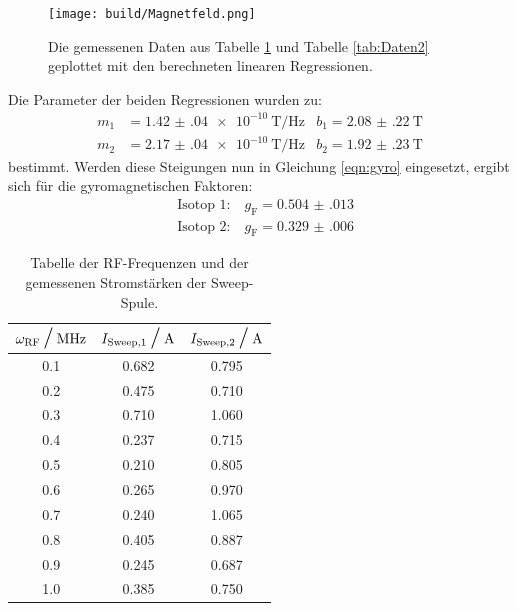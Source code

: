 		\begin{figure}[H]
			\centering
			\texttt{[image: build/Magnetfeld.png]}
			\caption{Die gemessenen Daten aus Tabelle \ref{tab:Daten1} und Tabelle \ref{tab:Daten2} geplottet mit den berechneten linearen Regressionen.}
			\label{fig:Daten} 
		\end{figure}

		\noindent
		Die Parameter der beiden Regressionen wurden zu:
		\begin{align*}
			m_1 &= \SI{1.42(04)e-10}{\tesla\per\hertz}  &b_1= \SI{2.08(22)}{\tesla}\\
			m_2 &= \SI{2.17(04)e-10}{\tesla\per\hertz}  &b_2= \SI{1.92(23)}{\tesla}
		\end{align*}
		bestimmt. Werden diese Steigungen nun in Gleichung \ref{eqn:gyro} eingesetzt, ergibt sich für die gyromagnetischen Faktoren:
		\begin{align*}
			&\text{Isotop 1:} \quad g_\text{F} = \num{0.504(013)}\\		
			&\text{Isotop 2:} \quad g_\text{F} = \num{0.329(006)}			
		\end{align*}

		\begin{table}[h]
			\begin{center}
				\begin{tabular}{c c c  }%
					\toprule
						{$\omega_\text{RF} \mathbin{\scalebox{1.5} / } \si{\mega\hertz}$} & {$I_\text{Sweep,1}  \mathbin{\scalebox{1.5} / } \si{\ampere}$} & 
          				{$I_\text{Sweep,2} \mathbin{\scalebox{1.5} / } \si{\ampere}$}\\
					\midrule
 					0.1	& 0.682 & 0.795\\
					0.2 & 0.475 & 0.710\\
					0.3 & 0.710 & 1.060\\
					0.4 & 0.237 & 0.715\\
					0.5 & 0.210 & 0.805\\
					0.6 & 0.265 & 0.970\\
					0.7 & 0.240 & 1.065\\
					0.8 & 0.405 & 0.887\\ 
					0.9 & 0.245 & 0.687\\
					1.0 & 0.385 & 0.750\\
					\bottomrule
				\end{tabular}				
				\caption{Tabelle der RF-Frequenzen und der gemessenen Stromstärken der Sweep-Spule.}
				\label{tab:Daten1}
			\end{center}
		\end{table}

